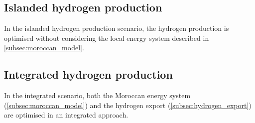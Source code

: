 \subsection{Islanded hydrogen production}
In the islanded hydrogen production scenario, the hydrogen production is optimised without considering the local energy system described in \ref{subsec:moroccan_model}.


\subsection{Integrated hydrogen production}
In the integrated scenario, both the Moroccan energy system (\ref{subsec:moroccan_model}) and the hydrogen export (\ref{subsec:hydrogen_export})
are optimised in an integrated approach.